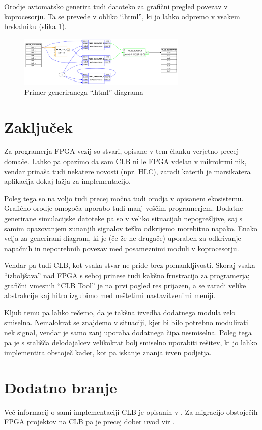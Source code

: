 \documentclass[a4paper]{article}
\begin{document}
\begin{sloppypar}
Orodje avtomatsko generira tudi datoteko za grafični pregled povezav v
koprocesorju. Ta se prevede v obliko ``.html'', ki jo lahko odpremo v vsakem
brskalniku (slika \ref{fig:clbtool_diagram})\cite[Pogl.~1]{clb-user-guide}.

\begin{figure}[htb]
    \centerline{\includegraphics[width=8cm]{html_diagram}}
    \caption{Primer generiranega ``.html'' diagrama}
    \label{fig:clbtool_diagram} 
\end{figure} 



\section{Zaključek}
Za programerja FPGA vezij so stvari, opisane v tem članku verjetno precej
domače. Lahko pa opazimo da sam CLB ni le FPGA vdelan v mikrokrmilnik, vendar
prinaša tudi nekatere novosti (npr. HLC), zaradi katerih je marsikatera
aplikacija dokaj lažja za implementacijo.

Poleg tega so na voljo tudi precej močna tudi orodja v opisanem ekosistemu.
Grafično orodje omogoča uporabo tudi manj veščim programerjem. Dodatne
generirane simulacijske datoteke pa so v veliko situacijah nepogrešljive, saj s
samim opazovanjem zunanjih signalov težko odkrijemo morebitno napako. Enako
velja za generirani diagram, ki je (če že ne drugače) uporaben za odkrivanje
napačnih in nepotrebnih povezav med posameznimi moduli v koprocesorju.

Vendar pa tudi CLB, kot vsaka stvar ne pride brez pomankljivosti. Skoraj vsaka
``izboljšava'' nad FPGA s seboj prinese tudi kakšno frustracijo za programerja;
grafični vmesnih ``CLB Tool'' je na prvi pogled res prijazen, a se zaradi
velike abstrakcije kaj hitro izgubimo med neštetimi nastavitvenimi meniji.

Kljub temu pa lahko rečemo, da je takšna izvedba dodatnega modula zelo
smiselna. Nemalokrat se znajdemo v situaciji, kjer bi bilo potrebno modulirati
nek signal, vendar je samo zanj uporaba dodatnega čipa nesmiselna. Poleg tega
pa je s stališča delodajalcev velikokrat bolj smiselno uporabiti rešitev, ki jo
lahko implementira obstoječ kader, kot pa iskanje znanja izven podjetja.



\section{Dodatno branje}
Več informacij o sami implementaciji CLB je opisanih v \cite{clb-designing}. Za
migracijo obstoječih FPGA projektov na CLB pa je precej dober uvod vir
\cite{fpga-to-clb}.



\printbibliography



\end{sloppypar}
\end{document}
